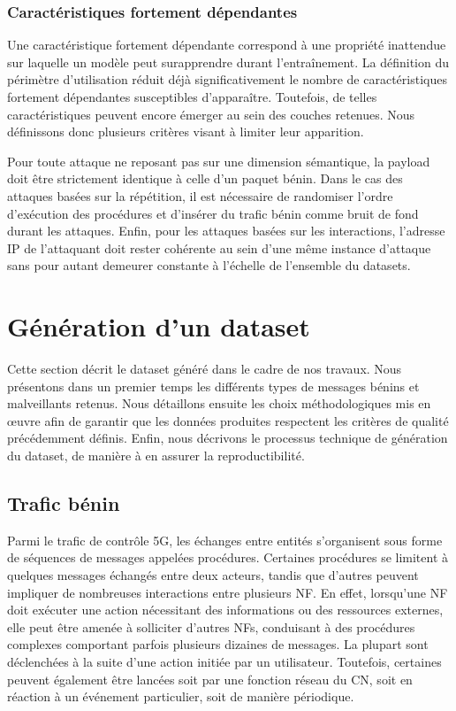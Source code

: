 \documentclass[a4paper,11pt,twoside]{StyleThese}
\begin{document}
\subsubsection{Caractéristiques fortement dépendantes}
Une caractéristique fortement dépendante correspond à une propriété inattendue sur laquelle un modèle peut surapprendre durant l’entraînement. La définition du périmètre d'utilisation réduit déjà significativement le nombre de caractéristiques fortement dépendantes susceptibles d’apparaître. Toutefois, de telles caractéristiques peuvent encore émerger au sein des couches retenues. Nous définissons donc plusieurs critères visant à limiter leur apparition.

Pour toute attaque ne reposant pas sur une dimension sémantique, la payload doit être strictement identique à celle d’un paquet bénin. Dans le cas des attaques basées sur la répétition, il est nécessaire de randomiser l’ordre d’exécution des procédures et d’insérer du trafic bénin comme bruit de fond durant les attaques. Enfin, pour les attaques basées sur les interactions, l’adresse IP de l’attaquant doit rester cohérente au sein d’une même instance d’attaque sans pour autant demeurer constante à l’échelle de l’ensemble du datasets.

\section{Génération d'un dataset}
Cette section décrit le dataset généré dans le cadre de nos travaux. Nous présentons dans un premier temps les différents types de messages bénins et malveillants retenus. Nous détaillons ensuite les choix méthodologiques mis en œuvre afin de garantir que les données produites respectent les critères de qualité précédemment définis. Enfin, nous décrivons le processus technique de génération du dataset, de manière à en assurer la reproductibilité.

\subsection{Trafic bénin}
Parmi le trafic de contrôle 5G, les échanges entre entités s’organisent sous forme de séquences de messages appelées procédures. Certaines procédures se limitent à quelques messages échangés entre deux acteurs, tandis que d’autres peuvent impliquer de nombreuses interactions entre plusieurs NF. En effet, lorsqu’une NF doit exécuter une action nécessitant des informations ou des ressources externes, elle peut être amenée à solliciter d’autres NFs, conduisant à des procédures complexes comportant parfois plusieurs dizaines de messages. La plupart sont déclenchées à la suite d’une action initiée par un utilisateur. Toutefois, certaines peuvent également être lancées soit par une fonction réseau du CN, soit en réaction à un événement particulier, soit de manière périodique. 
\end{document}
